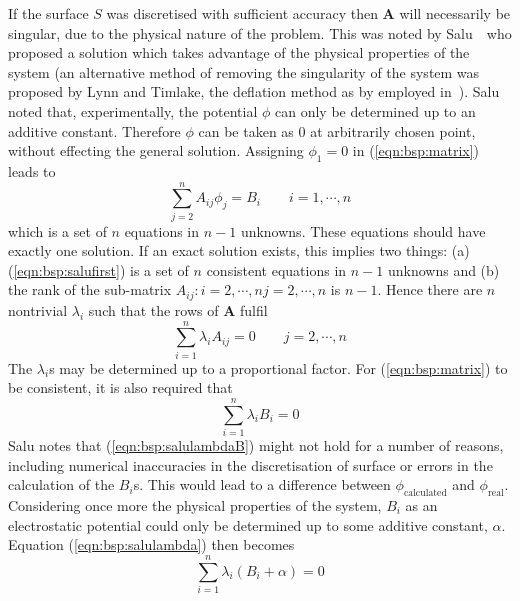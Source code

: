 If the surface $S$ was discretised with sufficient accuracy then $\mathbf{A}$
will necessarily be singular, due to the physical nature of the problem.
This was noted by Salu~\cite{Salu1980}\ who proposed a solution which takes
advantage of the physical properties of the system (an alternative method of
removing the singularity of the system was proposed by Lynn and Timlake, the
deflation method as by employed in~\cite{Barnard1967}).
Salu noted that, experimentally, the potential $\phi$ can only be determined up to
an additive constant.
Therefore $\phi$ can be taken as $0$ at arbitrarily chosen point, without
effecting the general solution.
Assigning $\phi_1 = 0$ in (\ref{eqn:bsp:matrix}) leads to
\begin{equation}
\label{eqn:bsp:salufirst}
\sum_{j=2}^n A_{ij} \phi_j = B_i \quad\quad  i = 1,\cdots, n
\end{equation}
which is a set of $n$ equations in $n-1$ unknowns.
These equations should have exactly one solution.
If an exact solution exists, this implies two things: (a)
(\ref{eqn:bsp:salufirst}) is a set of $n$ consistent equations in $n-1$ unknowns
and (b) the rank of the sub-matrix $A_{ij}: i=2,\cdots,n j=2,\cdots,n$ is $n-1$.
Hence there are $n$ nontrivial $\lambda_i$ such that the rows of $\textbf{A}$
fulfil
\begin{equation}
\label{eqn:bsp:salulambda}
\sum_{i=1}^n \lambda_i A_{ij}  = 0 \quad\quad  j = 2,\cdots, n
\end{equation}
The $\lambda_i$s may be determined up to a proportional factor.
For (\ref{eqn:bsp:matrix}) to be consistent, it is also required that
\begin{equation}
\label{eqn:bsp:salulambdaB}
\sum_{i=1}^n \lambda_i B_i  = 0
\end{equation}
Salu notes that (\ref{eqn:bsp:salulambdaB}) might not hold for a number of
reasons, including numerical inaccuracies in the discretisation of surface or
errors in the calculation of the $B_i$s.
This would lead to a difference between $\phi_{\text{calculated}}$ and
$\phi_{\text{real}}$.
Considering once more the physical properties of the system, $B_i$ as an
electrostatic potential could only be determined up to some additive constant,
$\alpha$.
Equation (\ref{eqn:bsp:salulambda}) then becomes
\begin{equation}
\label{eqn:bsp:salulambdaalpha}
\sum_{i=1}^n \lambda_i \left(B_i+\alpha\right)  = 0
\end{equation}

